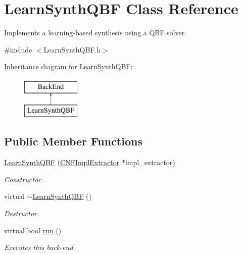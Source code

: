 \hypertarget{classLearnSynthQBF}{\section{Learn\-Synth\-Q\-B\-F Class Reference}
\label{classLearnSynthQBF}
}


Implements a learning-\/based synthesis using a Q\-B\-F solver.  




{\ttfamily \#include $<$Learn\-Synth\-Q\-B\-F.\-h$>$}

Inheritance diagram for Learn\-Synth\-Q\-B\-F\-:\begin{figure}[H]
\begin{center}
\leavevmode
\includegraphics[height=2.000000cm]{classLearnSynthQBF}
\end{center}
\end{figure}
\subsection*{Public Member Functions}
\begin{DoxyCompactItemize}
\item 
\hyperlink{classLearnSynthQBF_ae7f4fe1f847d6af8ecebaa9a9f631b7c}{Learn\-Synth\-Q\-B\-F} (\hyperlink{classCNFImplExtractor}{C\-N\-F\-Impl\-Extractor} $\ast$impl\-\_\-extractor)
\begin{DoxyCompactList}\small\item\em Constructor. \end{DoxyCompactList}\item 
virtual \hyperlink{classLearnSynthQBF_a692e516f27fd78a44884b715688bd7d9}{$\sim$\-Learn\-Synth\-Q\-B\-F} ()
\begin{DoxyCompactList}\small\item\em Destructor. \end{DoxyCompactList}\item 
virtual bool \hyperlink{classLearnSynthQBF_aed85bb2fe317a5fdc7eef71fe598c606}{run} ()
\begin{DoxyCompactList}\small\item\em Executes this back-\/end. \end{DoxyCompactList}\end{DoxyCompactItemize}
